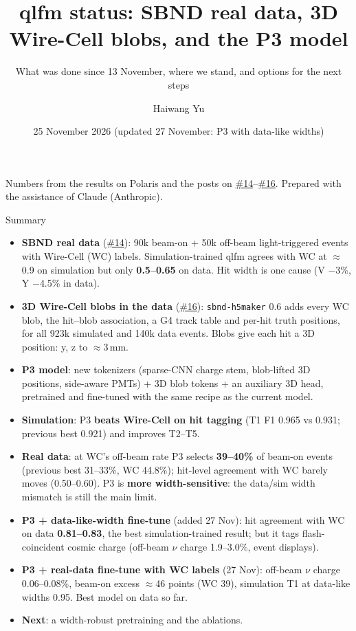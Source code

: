 \documentclass[aspectratio=169,10pt]{beamer}
\title{qlfm status: SBND real data, 3D Wire-Cell blobs, and the P3 model}
\subtitle{What was done since 13 November, where we stand, and options for the next steps}
\author{Haiwang Yu}
\institute{fm4npp-lartpc \;\textbullet\; issues \iss{14} (SBND real data), \iss{15} (3D survey), \iss{16} (P3)}
\date{25 November 2026 (updated 27 November: P3 with data-like widths)}
\newcommand{\code}[1]{\texttt{#1}}
\newcommand{\good}[1]{{\color{green!45!black}\textbf{#1}}}
\newcommand{\bad}[1]{{\color{red!70!black}\textbf{#1}}}
\newcommand{\gh}{https://github.com/HaiwangYu/fm4npp-lartpc}
\newcommand{\iss}[1]{\href{\gh/issues/#1}{\color{blue!60!black}\##1}}
\begin{document}
\begin{frame}
  \titlepage
  \vfill
  {\tiny Numbers from the results on Polaris and the posts on \iss{14}--\iss{16}. Prepared with the assistance of Claude (Anthropic).}
\end{frame}

\begin{frame}{Summary}
  \footnotesize
  \begin{itemize}\setlength{\itemsep}{2pt}
    \item \textbf{SBND real data} (\iss{14}): 90k beam-on + 50k off-beam light-triggered events with Wire-Cell (WC) labels. Simulation-trained qlfm
      agrees with WC at $\approx$0.9 on simulation but only \bad{0.5--0.65} on data. Hit width is one cause (V $-$3\%, Y $-$4.5\% in data).
    \item \textbf{3D Wire-Cell blobs in the data} (\iss{16}): \code{sbnd-h5maker} 0.6 adds every WC blob, the hit--blob association, a G4 track table
      and per-hit truth positions, for all 923k simulated and 140k data events. Blobs give each hit a 3D position: y, z to $\approx$3\,mm.
    \item \textbf{P3 model}: new tokenizers (sparse-CNN charge stem, blob-lifted 3D positions, side-aware PMTs) + 3D blob tokens + an auxiliary
      3D head, pretrained and fine-tuned with the same recipe as the current model.
    \item \textbf{Simulation}: P3 \good{beats Wire-Cell on hit tagging} (T1 F1 0.965 vs 0.931; previous best 0.921) and improves T2--T5.
    \item \textbf{Real data}: at WC's off-beam rate P3 selects \good{39--40\%} of beam-on events (previous best 31--33\%, WC 44.8\%);
      hit-level agreement with WC barely moves (0.50--0.60). P3 is \bad{more width-sensitive}: the data/sim width mismatch is still the main limit.
    \item \textbf{P3 + data-like-width fine-tune} (added 27 Nov): hit agreement with WC on data \good{0.81--0.83}, the best simulation-trained
      result; but it tags flash-coincident cosmic charge (off-beam $\nu$ charge 1.9--3.0\%, event displays).
    \item \textbf{P3 + real-data fine-tune with WC labels} (27 Nov): off-beam $\nu$ charge 0.06--0.08\%, beam-on excess $\approx$46 points
      (WC 39), simulation T1 at data-like widths 0.95. Best model on data so far.
    \item \textbf{Next}: a width-robust pretraining and the ablations.
  \end{itemize}
\end{frame}
\end{document}
